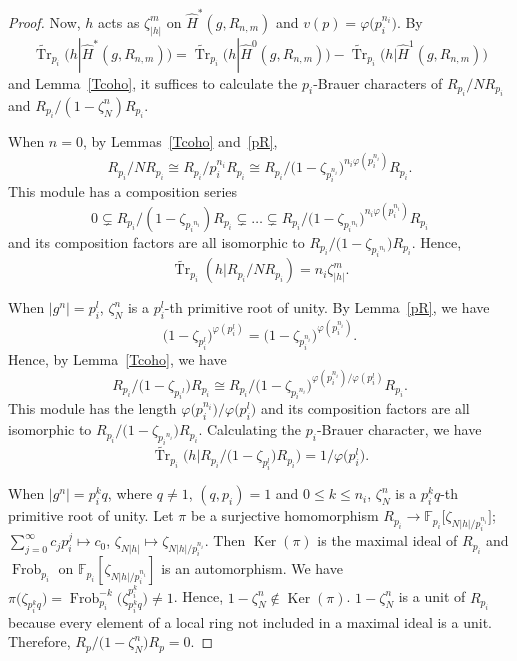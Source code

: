\documentclass[11pt]{article}
\numberwithin{equation}{section}
\numberwithin{equation}{section}
\begin{document}
\begin{proof}Now, $h$ acts as $\zeta_{|h|}^m$ on $\hat{H}^*(g,R_{n,m})$ and $v(p)=\varphi\big(p_i^{n_i}\big)$. By \[
\widetilde{\operatorname{Tr}}_{p_i}\big(h|\hat{H}^*(g,R_{n,m})\big)=\widetilde{\operatorname{Tr}}_{p_i}\big(h|\hat{H}^0(g,R_{n,m})\big) -\widetilde{\operatorname{Tr}}_{p_i}\big(h|\hat{H}^1(g,R_{n,m})\big)
\]
 and Lemma~\ref{Tcoho}, it suffices to calculate the $p_i$-Brauer characters of $R_{p_i}/NR_{p_i}$ and $R_{p_i}/(1-\zeta_N^n)R_{p_i}$.

 When $n=0$, by Lemmas~\ref{Tcoho} and~\ref{pR},
\[
 R_{p_i}/NR_{p_i}\cong R_{p_i}/p_i^{n_i}R_{p_i}\cong R_{p_i}/\big(1-\zeta_{p_i^{n_i}}\big)^{n_i\varphi(p_i^{n_i})}R_{p_i}.
\]
This module has a composition series
\[
0\subsetneq R_{p_i}/(1-\zeta_{{p_i}^{n_i}})R_{p_i}\subsetneq \dots \subsetneq R_{p_i}/\big(1-\zeta_{{p_i}^{n_i}}\big)^{n_i\varphi(p_i^{n_i})}R_{p_i}
\]
 and its composition factors are all isomorphic to $R_{p_i}/\big(1-\zeta_{{p_i}^{n_i}}\big)R_{p_i}$. Hence,
\[
 \widetilde{\operatorname{Tr}}_{p_i}(h|R_{p_i}/NR_{p_i})=n_i\zeta_{|h|}^m.
\]

 When $|g^n|=p_i^l$, $\zeta_N^n$ is a $p_i^l$-th primitive root of unity. By Lemma~\ref{pR}, we have
\[
 \big(1-\zeta_{p_i^l}\big)^{\varphi(p_i^l)}=\big(1-\zeta_{p_i^{n_i}}\big)^{\varphi(p_i^{n_i})}.
\]
 Hence, by Lemma~\ref{Tcoho}, we have
\[
R_{p_i}/\big(1-\zeta_{{p_i}^l}\big)R_{p_i}\cong R_{p_i}/\big(1-\zeta_{{p_i}^{n_i}}\big)^{\varphi(p_i^{n_i})/\varphi(p_i^l)}R_{p_i}.
\]
 This module has the length $\varphi\big(p_i^{n_i}\big)/\varphi\big(p_i^l\big)$ and its composition factors are all isomorphic to $R_{p_i}/\big(1-\zeta_{{p_i}^{n_i}}\big)R_{p_i}$. Calculating the $p_i$-Brauer character, we have
\[
 \widetilde{\operatorname{Tr}}_{p_i}\big(h|R_{p_i}/\big(1-\zeta_{p_i^l}\big)R_{p_i}\big)=1/\varphi\big(p_i^l\big).
\]

 When $|g^n|=p_i^kq$, where $q\neq 1$, $(q,p_i)=1$ and $0\leq k\leq n_i$, $\zeta_N^n$ is a $p_i^kq$-th primitive root of unity. Let $\pi$ be a surjective homomorphism $R_{p_i}\rightarrow \mathbb{F}_{p_i}\big[\zeta_{N|h|/p_i^{n_i}}\big]$; $\sum_{j=0}^\infty c_jp_i^j \mapsto c_0$, $\zeta_{N|h|} \mapsto \zeta_{N|h|/p_i^{n_i}}$. Then $\operatorname{Ker}(\pi)$ is the maximal ideal of $R_{p_i}$ and $\operatorname{Frob}_{p_i}$ on $\mathbb{F}_{p_i}[\zeta_{N|h|/p_i^{n_i}}]$ is an automorphism. We have $\pi\big(\zeta_{p_i^kq}\big)=\operatorname{Frob}_{p_i}^{-k}\big(\zeta_{p_i^kq}^{p_i^k}\big)\neq 1$.
 Hence, $1-\zeta_N^n \notin \operatorname{Ker}(\pi)$. $1-\zeta_N^n$ is a unit of $R_{p_i}$ because every element of a local ring not included in a maximal ideal is a unit. Therefore, $R_p/\big(1-\zeta_N^n\big)R_p=0$.
\end{proof}
\end{document}
